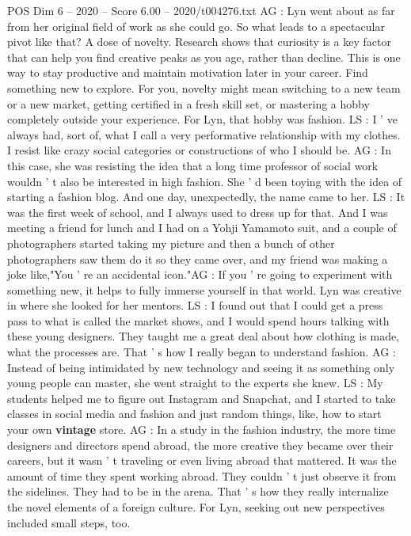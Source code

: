 \begin{textsample}{POS Dim 6 – 2020 – Score 6.00 – 2020/t004276.txt}
AG : Lyn went about as far from her original field of work as she could go.
So what leads to a spectacular pivot like that?
A dose of novelty.
Research shows that curiosity is a key factor that can help you find creative peaks as you age, rather than decline.
This is one way to stay productive and maintain motivation later in your career.
Find something new to explore.
For you, novelty might mean switching to a new team or a new market, getting certified in a fresh skill set, or mastering a hobby completely outside your experience.
For Lyn, that hobby was fashion.
LS : I ' ve always had, sort of, what I call a very performative relationship with my clothes.
I resist like crazy social categories or constructions of who I should be.
AG : In this case, she was resisting the idea that a long time professor of social work wouldn ' t also be interested in high fashion.
She ' d been toying with the idea of starting a fashion blog.
And one day, unexpectedly, the name came to her.
LS : It was the first week of school, and I always used to dress up for that.
And I was meeting a friend for lunch and I had on a Yohji Yamamoto suit, and a couple of photographers started taking my picture and then a bunch of other photographers saw them do it so they came over, and my friend was making a joke like,"You ' re an accidental icon."AG : If you ' re going to experiment with something new, it helps to fully immerse yourself in that world.
Lyn was creative in where she looked for her mentors.
LS : I found out that I could get a press pass to what is called the market shows, and I would spend hours talking with these young designers.
They taught me a great deal about how clothing is made, what the processes are.
That ' s how I really began to understand fashion.
AG : Instead of being intimidated by new technology and seeing it as something only young people can master, she went straight to the experts she knew.
LS : My students helped me to figure out Instagram and Snapchat, and I started to take classes in social media and fashion and just random things, like, how to start your own \textbf{vintage} store.
AG : In a study in the fashion industry, the more time designers and directors spend abroad, the more creative they became over their careers, but it wasn ' t traveling or even living abroad that mattered.
It was the amount of time they spent working abroad.
They couldn ' t just observe it from the sidelines.
They had to be in the arena.
That ' s how they really internalize the novel elements of a foreign culture.
For Lyn, seeking out new perspectives included small steps, too.

\end{textsample}
